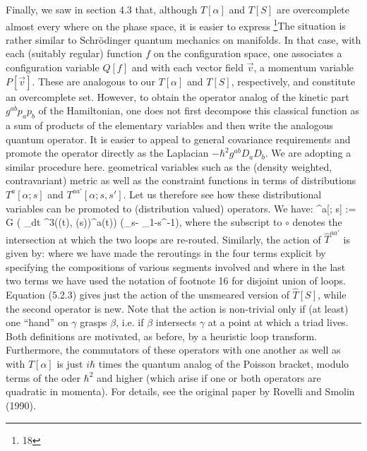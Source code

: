 Finally, we saw in section 4.3 that, although  $T[\alpha]$ and $T[S]$ are
overcomplete almost every where on the phase space, it is easier to express%
\footnote{18}{The situation is rather similar to Schr\"odinger quantum
mechanics on manifolds. In that case, with each (suitably regular) function
$f$ on the configuration space, one associates a configuration variable
$Q[f]$ and with each vector field $\vec v$, a momentum variable $P[\vec v]$.
These are analogous to our $T[\alpha]$ and $T[S]$, respectively, and constitute
an overcomplete set. However, to obtain the operator analog of the kinetic
part $g^{ab}p_ap_b$ of the Hamiltonian, one does not first decompose this
classical function as a sum of products of the elementary variables and then
write the analogous quantum operator. It is easier to appeal to general
covariance requirements and promote the operator directly as the Laplacian
$-\hbar^2 g^{ab}D_a D_b$. We are adopting a similar procedure here.}%
geometrical variables such as the (density weighted, contravariant) metric
as well as the constraint functions in terms of
distributions $T^a[\alpha; s]$ and $T^{aa'}[\alpha; s,s']$. Let us therefore
see how these distributional variables can be promoted to (distribution
valued) operators. We have:
\bneq
\langle\beta\mid \circ {}^a[\gamma; s] := {\hbar G} \big(
\oint_\beta dt \delta^3(\beta(t), \gamma(s))\dot\beta^a(t)\big)\-\cdot\-
\big(\langle\beta\circ_s\gamma\mid -
\langle \beta\circ_{1-s}\gamma^{-1}\mid \big),
where the subscript to $\circ$ denotes the intersection at which the two
loops are re-routed. Similarly, the action of $\hat{T}^{aa'}$ is given by:
where we have made the reroutings in the four terms explicit by specifying
the compositions of various segments involved and where in the last two terms
we have used the notation of footnote 16 for disjoint union of loops.
Equation (5.2.3) gives just the action of the unsmeared version
of $\hat{T}[S]$, while the second operator is new. Note that the action is
non-trivial only if (at least) one ``hand'' on $\gamma$ grasps $\beta$, i.e.
if $\beta$ intersects $\gamma$ at a point at which a triad lives. Both
definitions  are motivated, as before, by a heuristic loop transform.
Furthermore, the commutators of these operators with one another as well as
with $\hat{T}[\alpha ]$ is just $i\hbar$ times the quantum analog of the
Poisson bracket, modulo terms of the oder $\hbar^2$ and higher (which arise
if one or both operators are quadratic in momenta). For details, see the
original paper by Rovelli and Smolin (1990).

